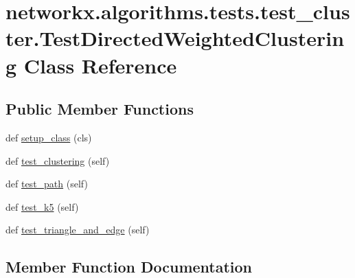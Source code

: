 \hypertarget{classnetworkx_1_1algorithms_1_1tests_1_1test__cluster_1_1TestDirectedWeightedClustering}{}\section{networkx.\+algorithms.\+tests.\+test\+\_\+cluster.\+Test\+Directed\+Weighted\+Clustering Class Reference}
\label{classnetworkx_1_1algorithms_1_1tests_1_1test__cluster_1_1TestDirectedWeightedClustering}
\subsection*{Public Member Functions}
\begin{DoxyCompactItemize}
\item 
def \hyperlink{classnetworkx_1_1algorithms_1_1tests_1_1test__cluster_1_1TestDirectedWeightedClustering_a32fb7a273317eb2ee0eaf4f95e321a46}{setup\+\_\+class} (cls)
\item 
def \hyperlink{classnetworkx_1_1algorithms_1_1tests_1_1test__cluster_1_1TestDirectedWeightedClustering_a07352b1822661d01026050e0a9e9c12c}{test\+\_\+clustering} (self)
\item 
def \hyperlink{classnetworkx_1_1algorithms_1_1tests_1_1test__cluster_1_1TestDirectedWeightedClustering_a90ec181bb480ac2941389fae245e4b27}{test\+\_\+path} (self)
\item 
def \hyperlink{classnetworkx_1_1algorithms_1_1tests_1_1test__cluster_1_1TestDirectedWeightedClustering_a1a896acb93d7e97a20fbade58c9493ff}{test\+\_\+k5} (self)
\item 
def \hyperlink{classnetworkx_1_1algorithms_1_1tests_1_1test__cluster_1_1TestDirectedWeightedClustering_ad30e70868eb127d2cc1071b8cee80c0c}{test\+\_\+triangle\+\_\+and\+\_\+edge} (self)
\end{DoxyCompactItemize}


\subsection{Member Function Documentation}
\mbox{\label{classnetworkx_1_1algorithms_1_1tests_1_1test__cluster_1_1TestDirectedWeightedClustering_a32fb7a273317eb2ee0eaf4f95e321a46}} 
